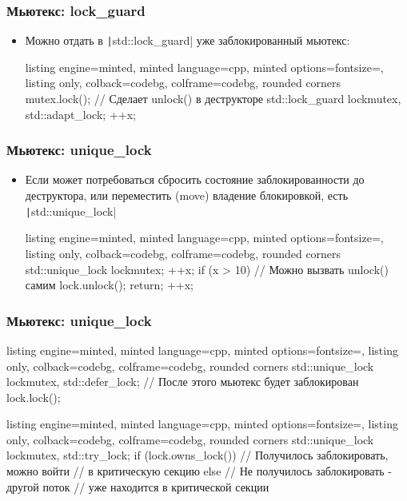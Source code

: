 \documentclass[10pt]{beamer}
\begin{document}
\begin{frame}[fragile]
\frametitle{Мьютекс: lock\_guard}
\begin{itemize}
\item Можно отдать в \texttt|std::lock_guard| уже заблокированный мьютекс:
\begin{tcblisting}{listing engine=minted, minted language=cpp, minted options={fontsize=\scriptsize}, listing only, colback=codebg, colframe=codebg, rounded corners}
mutex.lock();
// Сделает unlock() в деструкторе
std::lock_guard lock{mutex, std::adapt_lock};
++x;
\end{tcblisting}
\end{itemize}
\end{frame}

\begin{frame}[fragile]
\frametitle{Мьютекс: unique\_lock}
\begin{itemize}
\item Если может потребоваться сбросить состояние заблокированности до деструктора, или переместить (move) владение блокировкой, есть \texttt|std::unique_lock|
\pause
{}
\begin{tcblisting}{listing engine=minted, minted language=cpp, minted options={fontsize=\scriptsize}, listing only, colback=codebg, colframe=codebg, rounded corners}
std::unique_lock lock{mutex};
++x;
if (x > 10) {
  // Можно вызвать unlock() самим
  lock.unlock();
  return;
}
++x;
\end{tcblisting}
\end{itemize}
\end{frame}

\begin{frame}[fragile]
\frametitle{Мьютекс: unique\_lock}
\begin{itemize}
\begin{tcblisting}{listing engine=minted, minted language=cpp, minted options={fontsize=\scriptsize}, listing only, colback=codebg, colframe=codebg, rounded corners}
std::unique_lock lock{mutex, std::defer_lock};
// После этого мьютекс будет заблокирован
lock.lock();
\end{tcblisting}
\pause
{}
\begin{tcblisting}{listing engine=minted, minted language=cpp, minted options={fontsize=\scriptsize}, listing only, colback=codebg, colframe=codebg, rounded corners}
std::unique_lock lock{mutex, std::try_lock};
if (lock.owns_lock()) {
  // Получилось заблокировать, можно войти
  // в критическую секцию
} else {
  // Не получилось заблокировать - другой поток
  // уже находится в критической секции
}
\end{tcblisting}
\end{itemize}
\end{frame}
\end{document}
